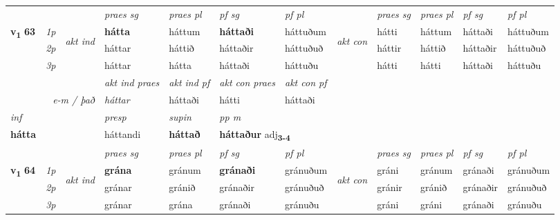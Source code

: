 \begin{longtable}[l]{X>{\footnotesize\itshape}llXXXXlXXXX}
 & &   & \textit{praes sg}  & \textit{praes pl}    & \textit{ pf sg} & \textit{pf pl} & & \textit{praes sg}  & \textit{praes pl}    & \textit{pf sg} & \textit{pf pl }  \\ \cmidrule{4-7} \cmidrule{9-12}
 \multirow{2}{*}{{{\textbf{v{\textsubscript{1}}} \Large{\textbf{63}}}}}  & 1p & \multirow{3}{*}{\begin{turn}{90}\textit{akt ind}\end{turn}} & \textbf{hátta} & háttum & \textbf{háttaði} & háttuðum & \multirow{3}{*}{\begin{turn}{90}\textit{akt con}\end{turn}} &hátti & háttum & háttaði & háttuðum\\*
 & 2p &  &  háttar  & háttið & háttaðir & háttuðuð & & háttir & háttið & háttaðir & háttuðuð \\*
 & 3p &  & háttar & hátta & háttaði & háttuðu & & hátti & hátti& háttaði & háttuðu \\*
\cmidrule{4-7} \cmidrule{9-12}

   && &  \textit{akt ind praes} & \textit{akt ind pf} & \textit{akt con praes} & \textit{akt con pf} \\*
\multicolumn{3}{r}{\textit{e-m / það}} & háttar & háttaði & hátti & háttaði \\*

\cmidrule{4-7}
   {\textit{inf}} & &     & \textit{presp} & \textit{supin}  & \textit{pp m} \\*
  {\textbf{hátta}} & &     & háttandi &  \textbf{háttað}  & \multicolumn{2}{l}{\textbf{háttaður} adj\textbf{\textsubscript{3-4}}} \\*

\midrule

 & &   & \textit{praes sg}  & \textit{praes pl}    & \textit{ pf sg} & \textit{pf pl} & & \textit{praes sg}  & \textit{praes pl}    & \textit{pf sg} & \textit{pf pl }  \\ \cmidrule{4-7} \cmidrule{9-12}
 \multirow{2}{*}{{{\textbf{v{\textsubscript{1}}} \Large{\textbf{64}}}}}  & 1p & \multirow{3}{*}{\begin{turn}{90}\textit{akt ind}\end{turn}} & \textbf{grána} & gránum & \textbf{gránaði} & gránuðum & \multirow{3}{*}{\begin{turn}{90}\textit{akt con}\end{turn}} &gráni & gránum & gránaði & gránuðum\\*
 & 2p &  &  gránar  & gránið & gránaðir & gránuðuð & & gránir & gránið & gránaðir & gránuðuð \\*
 & 3p &  & gránar & grána & gránaði & gránuðu & & gráni & gráni& gránaði & gránuðu \\*
\cmidrule{4-7} \cmidrule{9-12}


\end{longtable}
